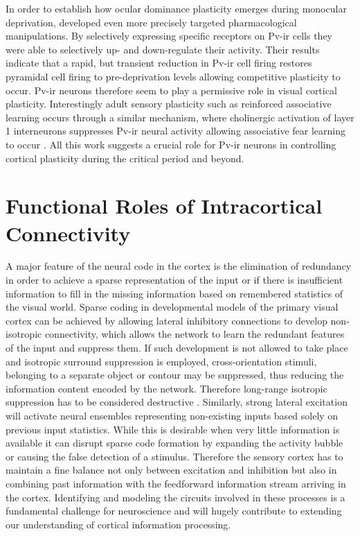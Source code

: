 In order to establish how ocular dominance plasticity emerges during
monocular deprivation, \cite{Kuhlman2013} developed even more
precisely targeted pharmacological manipulations. By selectively
expressing specific receptors on Pv-ir cells they were able to
selectively up- and down-regulate their activity. Their results
indicate that a rapid, but transient reduction in Pv-ir cell firing
restores pyramidal cell firing to pre-deprivation levels allowing
competitive plasticity to occur. Pv-ir neurons therefore seem to play
a permissive role in visual cortical plasticity. Interestingly adult
sensory plasticity such as reinforced associative learning occurs
through a similar mechanism, where cholinergic activation of layer 1
interneurons suppresses Pv-ir neural activity allowing associative
fear learning to occur \citep{Letzkus2011}. All this work suggests a
crucial role for Pv-ir neurons in controlling cortical plasticity
during the critical period and beyond.

\section{Functional Roles of Intracortical Connectivity}

A major feature of the neural code in the cortex is the elimination of
redundancy in order to achieve a sparse representation of the input or
if there is insufficient information to fill in the missing
information based on remembered statistics of the visual world.
Sparse coding in developmental models of the primary visual cortex can
be achieved by allowing lateral inhibitory connections to develop
non-isotropic connectivity, which allows the network to learn the
redundant features of the input and suppress them. If such development
is not allowed to take place and isotropic surround suppression is
employed, cross-orientation stimuli, belonging to a separate object or
contour may be suppressed, thus reducing the information content
encoded by the network. Therefore long-range isotropic suppression has
to be considered destructive \citep{Miikkulainen2005b}. Similarly,
strong lateral excitation will activate neural ensembles representing
non-existing inputs based solely on previous input statistics. While
this is desirable when very little information is available it can
disrupt sparse code formation by expanding the activity bubble or
causing the false detection of a stimulus. Therefore the sensory
cortex has to maintain a fine balance not only between excitation and
inhibition but also in combining past information with the feedforward
information stream arriving in the cortex. Identifying and modeling
the circuits involved in these processes is a fundamental challenge
for neuroscience and will hugely contribute to extending our
understanding of cortical information processing.

